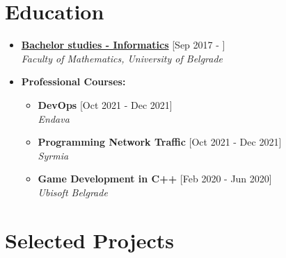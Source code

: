 \documentclass[a4paper]{moderncv}
\begin{document}
\makecvtitle



\section{Education}

\begin{itemize}

	\item \textbf{\href{http://www.matf.bg.ac.rs/eng/m/94/osnovne-informatics/}{Bachelor studies - Informatics}} \hfill [Sep 2017 - ]\\
	\textit{Faculty of Mathematics, University of Belgrade}				
	
	\vspace{0.4em}	
	\item \textbf{Professional Courses:}
	\vspace{-0.5em}	
	\begin{itemize}
		\item \textbf{DevOps} \hfill[Oct 2021 - Dec 2021]\\
		\small\textit{Endava}\normalsize

		\item \textbf{Programming Network Traffic} \hfill[Oct 2021 - Dec 2021]\\
		\small\textit{Syrmia}\normalsize

		\item \textbf{Game Development in C++} \hfill[Feb 2020 - Jun 2020]\\
		\small\textit{Ubisoft Belgrade}\normalsize
	\end{itemize}
	
\end{itemize}


\section{Selected Projects}	
\end{document}
